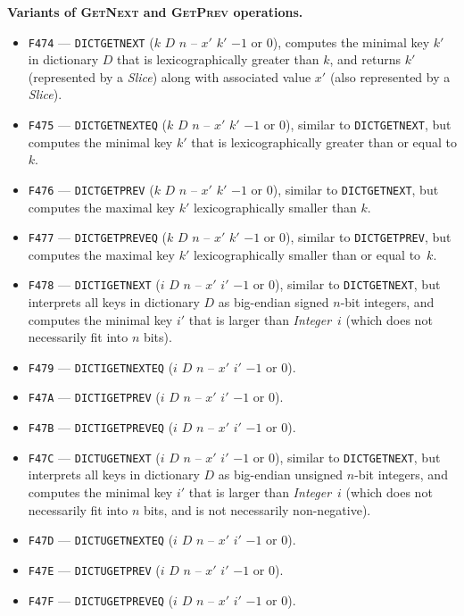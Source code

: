 \documentclass[12pt,oneside]{article}
\def\makepoint#1{\medbreak\noindent{\bf #1.\ }}
\def\nxsubpoint{\refstepcounter{subsubsection}%
  \smallbreak\makepoint{\thesubsubsection}}
\def\emb#1{\textbf{#1.}}
\begin{document}
\nxsubpoint\emb{Variants of \textsc{GetNext} and \textsc{GetPrev} operations}
\begin{itemize}
\item {\tt F474} --- {\tt DICTGETNEXT} ($k$ $D$ $n$ -- $x'$ $k'$ $-1$ or $0$), computes the minimal key $k'$ in dictionary $D$ that is lexicographically greater than $k$, and returns $k'$ (represented by a {\em Slice\/}) along with associated value $x'$ (also represented by a {\em Slice\/}).
\item {\tt F475} --- {\tt DICTGETNEXTEQ} ($k$ $D$ $n$ -- $x'$ $k'$ $-1$ or $0$), similar to {\tt DICTGETNEXT}, but computes the minimal key $k'$ that is lexicographically greater than or equal to $k$.
\item {\tt F476} --- {\tt DICTGETPREV} ($k$ $D$ $n$ -- $x'$ $k'$ $-1$ or $0$), similar to {\tt DICTGETNEXT}, but computes the maximal key $k'$ lexicographically smaller than $k$.
\item {\tt F477} --- {\tt DICTGETPREVEQ} ($k$ $D$ $n$ -- $x'$ $k'$ $-1$ or $0$), similar to {\tt DICTGETPREV}, but computes the maximal key $k'$ lexicographically smaller than or equal to~$k$.
\item {\tt F478} --- {\tt DICTIGETNEXT} ($i$ $D$ $n$ -- $x'$ $i'$ $-1$ or $0$), similar to {\tt DICTGETNEXT}, but interprets all keys in dictionary $D$ as big-endian signed $n$-bit integers, and computes the minimal key $i'$ that is larger than {\em Integer}~$i$ (which does not necessarily fit into $n$ bits).
\item {\tt F479} --- {\tt DICTIGETNEXTEQ} ($i$ $D$ $n$ -- $x'$ $i'$ $-1$ or $0$).
\item {\tt F47A} --- {\tt DICTIGETPREV} ($i$ $D$ $n$ -- $x'$ $i'$ $-1$ or $0$).
\item {\tt F47B} --- {\tt DICTIGETPREVEQ} ($i$ $D$ $n$ -- $x'$ $i'$ $-1$ or $0$).
\item {\tt F47C} --- {\tt DICTUGETNEXT} ($i$ $D$ $n$ -- $x'$ $i'$ $-1$ or $0$), similar to {\tt DICTGETNEXT}, but interprets all keys in dictionary $D$ as big-endian unsigned $n$-bit integers, and computes the minimal key $i'$ that is larger than {\em Integer}~$i$ (which does not necessarily fit into $n$ bits, and is not necessarily non-negative).
\item {\tt F47D} --- {\tt DICTUGETNEXTEQ} ($i$ $D$ $n$ -- $x'$ $i'$ $-1$ or $0$).
\item {\tt F47E} --- {\tt DICTUGETPREV} ($i$ $D$ $n$ -- $x'$ $i'$ $-1$ or $0$).
\item {\tt F47F} --- {\tt DICTUGETPREVEQ} ($i$ $D$ $n$ -- $x'$ $i'$ $-1$ or $0$).
\end{itemize}
\end{document}
